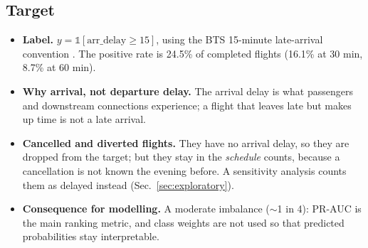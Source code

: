 \documentclass[conference]{IEEEtran}
\begin{document}
\subsection{Target}
\begin{itemize}
\item \textbf{Label.} $y=\mathbb{1}[\text{arr\_delay}\ge15]$, using the BTS 15-minute late-arrival convention \cite{btsdelaydefinitions}. The positive rate is 24.5\% of completed flights (16.1\% at 30 min, 8.7\% at 60 min).
\item \textbf{Why arrival, not departure delay.} The arrival delay is what passengers and downstream connections experience; a flight that leaves late but makes up time is not a late arrival.
\item \textbf{Cancelled and diverted flights.} They have no arrival delay, so they are dropped from the target; but they stay in the \emph{schedule} counts, because a cancellation is not known the evening before. A sensitivity analysis counts them as delayed instead (Sec.~\ref{sec:exploratory}).
\item \textbf{Consequence for modelling.} A moderate imbalance ($\sim$1 in 4): PR-AUC is the main ranking metric, and class weights are not used so that predicted probabilities stay interpretable.
\end{itemize}
\end{document}
